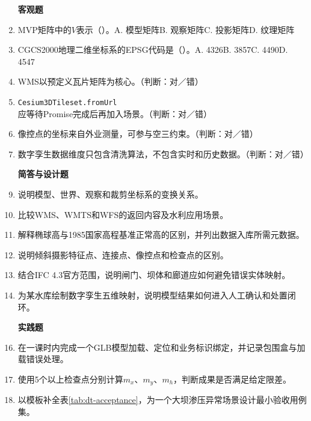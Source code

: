 \begin{enumerate}
\item[\textbf{客观题}]
\item MVP矩阵中的$V$表示（\quad）。A. 模型矩阵\quad B. 观察矩阵\quad C. 投影矩阵\quad D. 纹理矩阵
\item CGCS2000地理二维坐标系的EPSG代码是（\quad）。A. 4326\quad B. 3857\quad C. 4490\quad D. 4547
\item WMS以预定义瓦片矩阵为核心。（判断：对／错）
\item \texttt{Cesium3DTileset.fromUrl}应等待Promise完成后再加入场景。（判断：对／错）
\item 像控点的坐标来自外业测量，可参与空三约束。（判断：对／错）
\item 数字孪生数据维度只包含清洗算法，不包含实时和历史数据。（判断：对／错）

\item[\textbf{简答与设计题}]
\item 说明模型、世界、观察和裁剪坐标系的变换关系。
\item 比较WMS、WMTS和WFS的返回内容及水利应用场景。
\item 解释椭球高与1985国家高程基准正常高的区别，并列出数据入库所需元数据。
\item 说明倾斜摄影特征点、连接点、像控点和检查点的区别。
\item 结合IFC 4.3官方范围，说明闸门、坝体和廊道应如何避免错误实体映射。
\item 为某水库绘制数字孪生五维映射，说明模型结果如何进入人工确认和处置闭环。

\item[\textbf{实践题}]
\item 在一课时内完成一个GLB模型加载、定位和业务标识绑定，并记录包围盒与加载错误处理。
\item 使用5个以上检查点分别计算$m_x$、$m_y$、$m_h$，判断成果是否满足给定限差。
\item 以模板补全表\ref{tab:dt-acceptance}，为一个大坝渗压异常场景设计最小验收用例集。
\end{enumerate}
